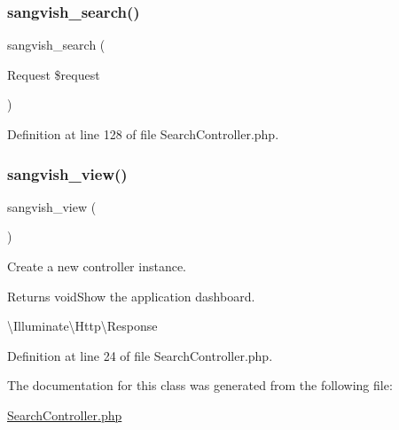 \subsubsection{\texorpdfstring{sangvish\_search()}{sangvish\_search()}}
{\footnotesize\ttfamily sangvish\+\_\+search (\begin{DoxyParamCaption}\item[{Request}]{\$request }\end{DoxyParamCaption})}



Definition at line 128 of file Search\+Controller.\+php.

\mbox{\label{class_responsive_1_1_http_1_1_controllers_1_1_search_controller_a8a8d08fbcb659dd796d5ba74a9faccb9}} 
\subsubsection{\texorpdfstring{sangvish\_view()}{sangvish\_view()}}
{\footnotesize\ttfamily sangvish\+\_\+view (\begin{DoxyParamCaption}{ }\end{DoxyParamCaption})}

Create a new controller instance.

\begin{DoxyReturn}{Returns}
void\+Show the application dashboard.

\textbackslash{}\+Illuminate\textbackslash{}\+Http\textbackslash{}\+Response 
\end{DoxyReturn}


Definition at line 24 of file Search\+Controller.\+php.



The documentation for this class was generated from the following file\+:\begin{DoxyCompactItemize}
\item 
\mbox{\hyperlink{_search_controller_8php}{Search\+Controller.\+php}}\end{DoxyCompactItemize}
